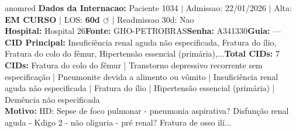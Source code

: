 \documentclass[a4paper,10pt]{article}
\begin{document}
\begin{anomalycard}[Internacao 162889 | GHO-PETROBRAS | CRITICO (z=5.17)]{anomred}
\textbf{Dados da Internacao:} Paciente 1034 $\mid$ Admissao: 22/01/2026 $\mid$ Alta: \textcolor{anomorange}{\textbf{EM CURSO}} $\mid$ LOS: \textbf{60d \textcolor{anomorange}{$\circlearrowleft$}} $\mid$ Readmissao 30d: Nao\\
\textbf{Hospital:} Hospital 26\quad\textbf{Fonte:} GHO-PETROBRAS\quad\textbf{Senha:} A341330\quad\textbf{Guia:} ---\\
\textbf{CID Principal:} {\small Insuficiência renal aguda não especificada, Fratura do ílio, Fratura do colo do fêmur, Hipertensão essencial (primária),...}\quad\textbf{Total CIDs:} 7\\

\textbf{CIDs:} {\scriptsize Fratura do colo do fêmur | Transtorno depressivo recorrente sem especificação | Pneumonite devida a alimento ou vômito | Insuficiência renal aguda não especificada | Fratura do ílio | Hipertensão essencial (primária) | Demência não especificada}\\

\textbf{Motivo:} {\scriptsize HD: Sepse de foco pulmonar - pneumonia aspirativa? Disfunção renal aguda - Kdigo 2 - não oliguria - pré renal? Fratura de osso ilí...}\\


\end{anomalycard}
\end{document}
